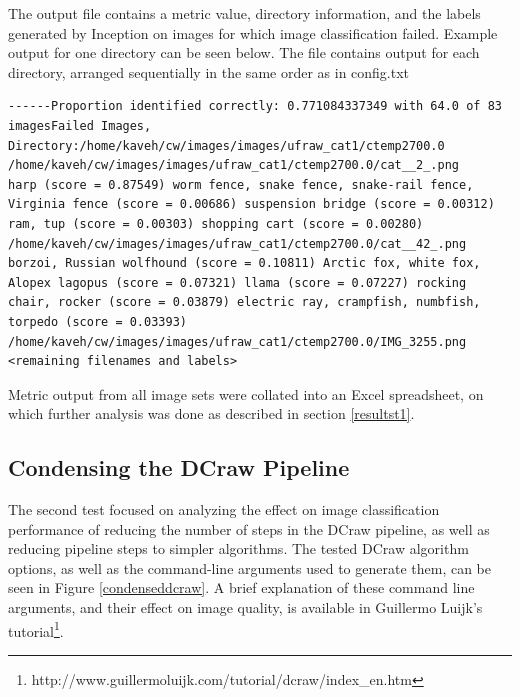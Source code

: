 \documentclass{report}
\begin{document}
The output file contains a metric value, directory information, and the labels generated by Inception on images for which image classification failed. Example output for one directory can be seen below. The file contains output for each directory, arranged sequentially in the same order as in config.txt
\tiny
\begin{verbatim}
------Proportion identified correctly: 0.771084337349 with 64.0 of 83 imagesFailed Images, Directory:/home/kaveh/cw/images/images/ufraw_cat1/ctemp2700.0
/home/kaveh/cw/images/images/ufraw_cat1/ctemp2700.0/cat__2_.png
harp (score = 0.87549) worm fence, snake fence, snake-rail fence, Virginia fence (score = 0.00686) suspension bridge (score = 0.00312) ram, tup (score = 0.00303) shopping cart (score = 0.00280)
/home/kaveh/cw/images/images/ufraw_cat1/ctemp2700.0/cat__42_.png
borzoi, Russian wolfhound (score = 0.10811) Arctic fox, white fox, Alopex lagopus (score = 0.07321) llama (score = 0.07227) rocking chair, rocker (score = 0.03879) electric ray, crampfish, numbfish, torpedo (score = 0.03393)
/home/kaveh/cw/images/images/ufraw_cat1/ctemp2700.0/IMG_3255.png
<remaining filenames and labels>
\end{verbatim}
\normalsize

Metric output from all image sets were collated into an Excel spreadsheet, on which further analysis was done as described in section \ref{resultst1}.

\subsection{Condensing the DCraw Pipeline}
\label{test2}
The second test focused on analyzing the effect on image classification performance of reducing the number of steps in the DCraw pipeline, as well as reducing pipeline steps to simpler algorithms. The tested DCraw algorithm options, as well as the command-line arguments used to generate them, can be seen in Figure \ref{condenseddcraw}. A brief explanation of these command line arguments, and their effect on image quality, is available in Guillermo Luijk's tutorial\footnote{http://www.guillermoluijk.com/tutorial/dcraw/index\_en.htm}.
\end{document}
